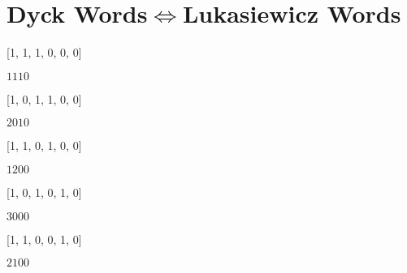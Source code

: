 \documentclass{article}
\begin{document}
\section*{Dyck Words$\iff$Lukasiewicz Words}
[1, 1, 1, 0, 0, 0]

$1110$

\bigskip

[1, 0, 1, 1, 0, 0]

$2010$

\bigskip

[1, 1, 0, 1, 0, 0]

$1200$

\bigskip

[1, 0, 1, 0, 1, 0]

$3000$

\bigskip

[1, 1, 0, 0, 1, 0]

$2100$

\bigskip
\end{document}
